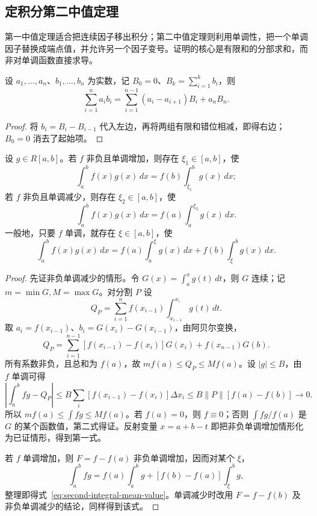 \subsection{定积分第二中值定理}
\label{subsec:second-integral-mean-value-theorem}

第一中值定理适合把连续因子移出积分；第二中值定理则利用单调性，把一个单调因子替换成端点值，并允许另一个因子变号。证明的核心是有限和的分部求和，而非对单调函数直接求导。

\begin{lemma}[阿贝尔变换]
\label{lem:abel-summation-finite}
设 $a_1,\ldots,a_n$、$b_1,\ldots,b_n$ 为实数，记 $B_0=0$、$B_k=\sum_{i=1}^kb_i$，则
\begin{equation}
    \sum_{i=1}^na_ib_i
    =\sum_{i=1}^{n-1}(a_i-a_{i+1})B_i+a_nB_n.
    \label{eq:abel-summation-finite}
\end{equation}
\end{lemma}
\begin{proof}
将 $b_i=B_i-B_{i-1}$ 代入左边，再将两组有限和错位相减，即得右边；$B_0=0$ 消去了起始项。
\end{proof}

\begin{theorem}[定积分第二中值定理]
\label{thm:second-integral-mean-value}
设 $g\in R[a,b]$。若 $f$ 非负且单调增加，则存在 $\xi_1\in[a,b]$，使
\[
    \int_a^b f(x)g(x)\,dx=f(b)\int_{\xi_1}^b g(x)\,dx;
\]
若 $f$ 非负且单调减少，则存在 $\xi_2\in[a,b]$，使
\[
    \int_a^b f(x)g(x)\,dx=f(a)\int_a^{\xi_2}g(x)\,dx.
\]
一般地，只要 $f$ 单调，就存在 $\xi\in[a,b]$，使
\begin{equation}
    \int_a^b f(x)g(x)\,dx
    =f(a)\int_a^\xi g(x)\,dx+f(b)\int_\xi^b g(x)\,dx.
    \label{eq:second-integral-mean-value}
\end{equation}
\end{theorem}
\begin{proof}
先证非负单调减少的情形。令 $G(x)=\int_a^x g(t)\,dt$，则 $G$ 连续；记 $m=\min G,M=\max G$。对分割 $P$ 设
\[
    Q_P=\sum_{i=1}^n f(x_{i-1})\int_{x_{i-1}}^{x_i}g(t)\,dt.
\]
取 $a_i=f(x_{i-1})$、$b_i=G(x_i)-G(x_{i-1})$，由阿贝尔变换，
\[
    Q_P=\sum_{i=1}^{n-1}[f(x_{i-1})-f(x_i)]G(x_i)
          +f(x_{n-1})G(b).
\]
所有系数非负，且总和为 $f(a)$，故 $mf(a)\leq Q_P\leq Mf(a)$。设 $|g|\leq B$，由 $f$ 单调可得
\[
    \left|\int_a^bfg-Q_P\right|
    \leq B\sum_i[f(x_{i-1})-f(x_i)]\Delta x_i
    \leq B\|P\|[f(a)-f(b)]\longrightarrow0.
\]
所以 $mf(a)\leq\int fg\leq Mf(a)$。若 $f(a)=0$，则 $f\equiv0$；否则 $\int fg/f(a)$ 是 $G$ 的某个函数值，第二式得证。反射变量 $x=a+b-t$ 即把非负单调增加情形化为已证情形，得到第一式。

若 $f$ 单调增加，则 $F=f-f(a)$ 非负单调增加，因而对某个 $\xi$，
\[
    \int_a^bfg=f(a)\int_a^bg+[f(b)-f(a)]\int_\xi^bg,
\]
整理即得式~\eqref{eq:second-integral-mean-value}。单调减少时改用 $F=f-f(b)$ 及非负单调减少的结论，同样得到该式。
\end{proof}

